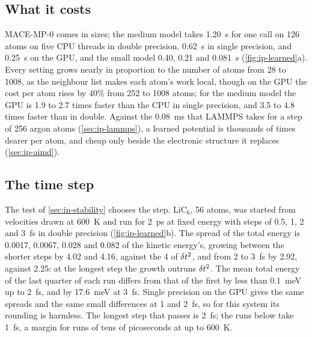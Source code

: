 \subsection*{What it costs}

MACE-MP-0 comes in sizes; the medium model takes \SI{1.20}{\second} for
one call on 126 atoms on five CPU threads in double precision,
\SI{0.62}{\second} in single precision, and \SI{0.25}{\second} on the GPU,
and the small model \num{0.40}, \num{0.21} and \SI{0.081}{\second}
(\cref{fig:ip-learned}a). Every setting grows nearly in proportion to
the number of atoms from 28 to 1008, as the neighbour list makes each
atom's work local, though on the GPU the cost per atom rises by 40\% from
252 to 1008 atoms; for the medium model the GPU is 1.9 to 2.7 times
faster than the CPU in single precision, and 3.5 to 4.8 times faster than
in double. Against the \SI{0.08}{\milli\second} that LAMMPS takes for a step
of 256 argon atoms (\cref{sec:ip-lammps}), a learned potential is
thousands of times dearer per atom, and cheap only beside the electronic
structure it replaces (\cref{sec:ip-aimd}).

\subsection*{The time step}

The test of \cref{sec:in-stability} chooses the step. LiC$_6$, 56 atoms,
was started from velocities drawn at \SI{600}{\kelvin} and run for
\SI{2}{\pico\second} at fixed energy with steps of 0.5, 1, 2 and
\SI{3}{\femto\second} in double precision (\cref{fig:ip-learned}b). The
spread of the total energy is 0.0017, 0.0067, 0.028 and 0.082 of the
kinetic energy's, growing between the shorter steps by 4.02 and 4.16,
against the 4 of $\delta t^2$, and from 2 to \SI{3}{\femto\second} by 2.92,
against 2.25: at the longest step the growth outruns $\delta t^2$. The mean
total energy of the last quarter of each run differs from that of the
first by less than \SI{0.1}{\milli\electronvolt} up to
\SI{2}{\femto\second}, and by \SI{17.6}{\milli\electronvolt} at
\SI{3}{\femto\second}. Single precision on the GPU gives the same spreads
and the same small differences at 1 and \SI{2}{\femto\second}, so for this
system its rounding is harmless. The longest step that passes is
\SI{2}{\femto\second}; the runs below take \SI{1}{\femto\second}, a
margin for runs of tens of picoseconds at up to \SI{600}{\kelvin}.

